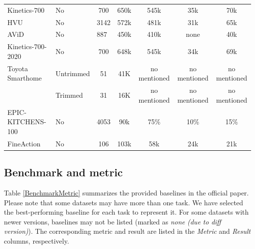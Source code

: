 \documentclass[a4paper]{article}
\begin{document}
\begin{table}[h]
\begin{tabular}{l|l|c c c c c}
		Kinetics-700            & No            & 700      & 650k         & 545k           & 35k          & 70k   \\
		HVU                     & No            & 3142     & 572k         & 481k           & 31k          & 65k      \\
		AViD                    & No            & 887      & 450k         & 410k           & none         & 40k      \\
		Kinetics-700-2020       & No            & 700      & 648k         & 545k           & 34k          & 69k        \\
		Toyota Smarthome        & Untrimmed     & 51       & 41K          & no mentioned   & no mentioned & no mentioned        \\
		                        & Trimmed       & 31       & 16K          & no mentioned   & no mentioned & no mentioned \\
		EPIC-KITCHENS-100       & No            & 4053     & 90k          & 75\%           & 10\%         & 15\%         \\	
		FineAction              & No            & 106      & 103k         & 58k            & 24k          & 21k         \\
		\bottomrule
		
	\end{tabular}%
	\label{DataStatistic}
\end{table}%

\subsection{Benchmark and metric}

Table \ref{BenchmarkMetric} summarizes the provided baselines in the official paper. Please note that some datasets may have more than one task. We have selected the best-performing baseline for each task to represent it. For some datasets with newer versions, baselines may not be listed (marked as \textit{none (due to diff version)}). The corresponding metric and result are listed in the \textit{Metric} and \textit{Result} columns, respectively.
\end{document}
